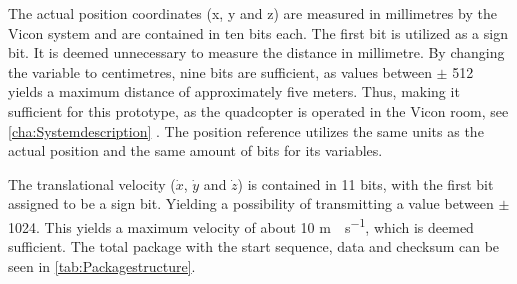 The actual position coordinates (x, y and z) are measured in millimetres by the Vicon system and are contained in ten bits each. The first bit is utilized as a sign bit. It is deemed unnecessary to measure the distance in millimetre. By changing the variable to centimetres, nine bits are sufficient, as values between $\pm$ 512 yields a maximum distance of approximately five meters. Thus, making it sufficient for this prototype, as the quadcopter is operated in the Vicon room, see \autoref{cha:Systemdescription} . The position reference utilizes the same units as the actual position and the same amount of bits for its variables.

The translational velocity ($\dot{x}$, $\dot{y}$ and $\dot{z}$) is contained in 11 bits, with the first bit assigned to be a sign bit. Yielding a possibility of transmitting a value between $\pm$ 1024. This yields a maximum velocity of about 10 \si{m \cdot s^{-1}}, which is deemed sufficient. The total package with the start sequence, data and checksum can be seen in \autoref{tab:Packagestructure}.

